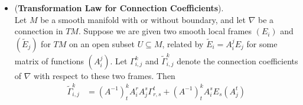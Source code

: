 \documentclass[11pt]{article}
\begin{document}
\begin{itemize}
\item \begin{proposition} (\textbf{Transformation Law for Connection Coefficients}).  \citep{lee2018introduction} \\
Let $M$ be a smooth manifold with or without boundary, and let $\nabla$ be a connection in $TM$. Suppose we are given two smooth local frames $(E_i)$ and $(\widetilde{E}_j)$ for $TM$ on an open subset $U \subseteq M$, related by $\widetilde{E}_i = A_i^j E_j$ for some matrix of functions $(A_i^j)$. Let $\Gamma_{i,j}^{k}$ and $\widetilde{\Gamma}_{i,j}^{k}$ denote the connection coefficients of $\nabla$ with respect to these two frames.
Then
\begin{align}
\widetilde{\Gamma}_{i,j}^{k} &= (A^{-1})_{t}^{k}A_{i}^{r}A_{j}^{s}\Gamma_{r,s}^{t}+ (A^{-1})_{t}^{k}A_{i}^{s}E_{s}(A_{j}^{t})  \label{eqn: chistoffel_symbol_change_of_basis}
\end{align}
\end{proposition}
\end{itemize}
\end{document}
